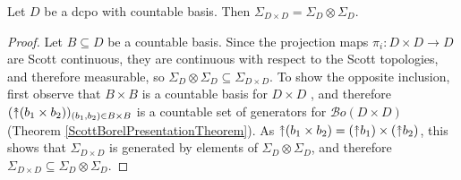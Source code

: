 \documentclass{lmcs}
\newcommand{\uu}{\rotatebox[origin=c]{90}{$\twoheadrightarrow$}}
\newcommand{\Bo}{\ensuremath{\mathcal{B}o}} %
\begin{document}
\begin{lem}
\label{BorelTensorLemma}
Let $D$ be a dcpo with countable basis. Then $\Sigma_{D\times D} = \Sigma_D \otimes \Sigma_D$. 
\end{lem}
\begin{proof}
Let $B \subseteq D$ be a countable basis. Since the projection maps $\pi_i : D \times D \rightarrow D$ are Scott continuous, they are continuous with respect to the Scott topologies, and therefore measurable, so $\Sigma_D \otimes \Sigma_D \subseteq \Sigma_{D\times D}$. To show the opposite inclusion, first observe that $B \times B$ is a countable basis for $D \times D$ \cite[Proposition III-4.12 (i)]{gierz}, and therefore $(\uu (b_1 \times b_2))_{(b_1,b_2) \in B \times B}$ is a countable set of generators for $\Bo(D \times D)$ (Theorem \ref{ScottBorelPresentationTheorem}). As $\uu (b_1 \times b_2) = (\uu b_1) \times (\uu b_2)$, this shows that $\Sigma_{D \times D}$ is generated by elements of $\Sigma_D \otimes \Sigma_D$, and therefore $\Sigma_{D \times D} \subseteq \Sigma_D \otimes \Sigma_D$. 
\end{proof}
\end{document}

